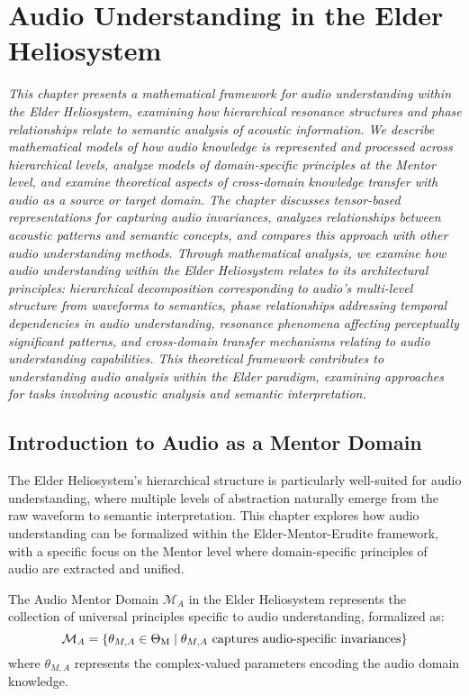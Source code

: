 \chapter{Audio Understanding in the Elder Heliosystem}

\textit{This chapter presents a mathematical framework for audio understanding within the Elder Heliosystem, examining how hierarchical resonance structures and phase relationships relate to semantic analysis of acoustic information. We describe mathematical models of how audio knowledge is represented and processed across hierarchical levels, analyze models of domain-specific principles at the Mentor level, and examine theoretical aspects of cross-domain knowledge transfer with audio as a source or target domain. The chapter discusses tensor-based representations for capturing audio invariances, analyzes relationships between acoustic patterns and semantic concepts, and compares this approach with other audio understanding methods. Through mathematical analysis, we examine how audio understanding within the Elder Heliosystem relates to its architectural principles: hierarchical decomposition corresponding to audio's multi-level structure from waveforms to semantics, phase relationships addressing temporal dependencies in audio understanding, resonance phenomena affecting perceptually significant patterns, and cross-domain transfer mechanisms relating to audio understanding capabilities. This theoretical framework contributes to understanding audio analysis within the Elder paradigm, examining approaches for tasks involving acoustic analysis and semantic interpretation.}

\section{Introduction to Audio as a Mentor Domain}

The Elder Heliosystem's hierarchical structure is particularly well-suited for audio understanding, where multiple levels of abstraction naturally emerge from the raw waveform to semantic interpretation. This chapter explores how audio understanding can be formalized within the Elder-Mentor-Erudite framework, with a specific focus on the Mentor level where domain-specific principles of audio are extracted and unified.

\begin{definition}
The Audio Mentor Domain $\mathcal{M}_A$ in the Elder Heliosystem represents the collection of universal principles specific to audio understanding, formalized as:
\begin{equation}
\mathcal{M}_A = \{\theta_{M,A} \in \Theta_{\text{M}} \mid \theta_{M,A} \text{ captures audio-specific invariances}\}
\end{equation}
where $\theta_{M,A}$ represents the complex-valued parameters encoding the audio domain knowledge.
\end{definition}

